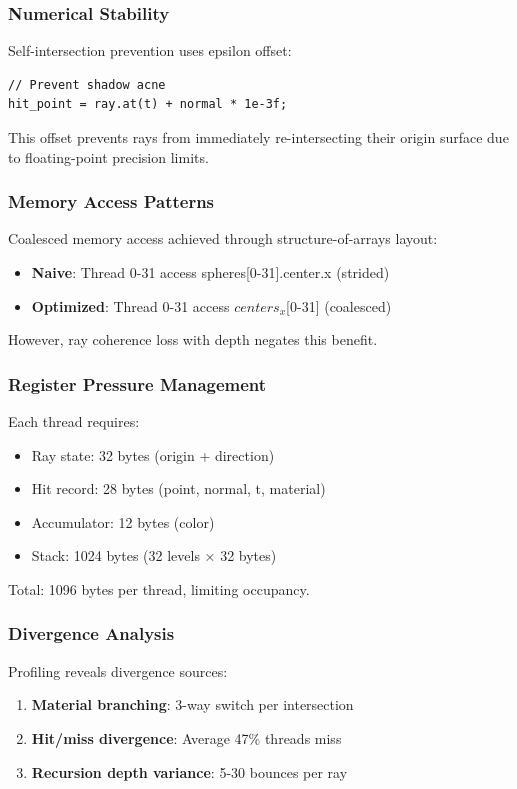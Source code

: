 \documentclass[conference]{IEEEtran}
\begin{document}
\subsubsection{Numerical Stability}
Self-intersection prevention uses epsilon offset:
\begin{lstlisting}
// Prevent shadow acne
hit_point = ray.at(t) + normal * 1e-3f;
\end{lstlisting}
This offset prevents rays from immediately re-intersecting their origin surface due to floating-point precision limits.

\subsubsection{Memory Access Patterns}
Coalesced memory access achieved through structure-of-arrays layout:
\begin{itemize}
    \item \textbf{Naive}: Thread 0-31 access spheres[0-31].center.x (strided)
    \item \textbf{Optimized}: Thread 0-31 access $centers_x$[0-31] (coalesced)
\end{itemize}
However, ray coherence loss with depth negates this benefit.

\subsubsection{Register Pressure Management}
Each thread requires:
\begin{itemize}
    \item Ray state: 32 bytes (origin + direction)
    \item Hit record: 28 bytes (point, normal, t, material)
    \item Accumulator: 12 bytes (color)
    \item Stack: 1024 bytes (32 levels × 32 bytes)
\end{itemize}
Total: 1096 bytes per thread, limiting occupancy.

\subsubsection{Divergence Analysis}
Profiling reveals divergence sources:
\begin{enumerate}
    \item \textbf{Material branching}: 3-way switch per intersection
    \item \textbf{Hit/miss divergence}: Average 47\% threads miss
    \item \textbf{Recursion depth variance}: 5-30 bounces per ray
\end{enumerate}
\end{document}
